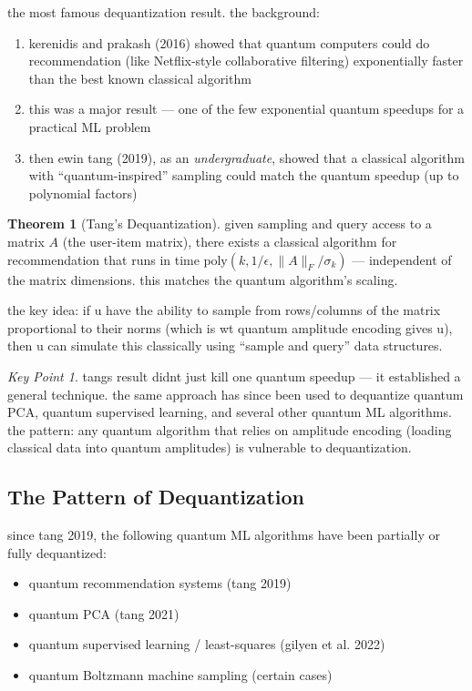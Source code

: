 \documentclass[11pt,a4paper]{article}
\theoremstyle{definition}
\newtheorem{theorem}{Theorem}[section]
\theoremstyle{remark}
\newtheorem*{keypoint}{Key Point}
\begin{document}
the most famous dequantization result. the background:

\begin{enumerate}[label=\arabic*.]
    \item kerenidis and prakash (2016) showed that quantum computers could do recommendation (like Netflix-style collaborative filtering) exponentially faster than the best known classical algorithm
    \item this was a major result --- one of the few exponential quantum speedups for a practical ML problem
    \item then ewin tang (2019), as an \emph{undergraduate}, showed that a classical algorithm with ``quantum-inspired'' sampling could match the quantum speedup (up to polynomial factors)
\end{enumerate}

\begin{theorem}[Tang's Dequantization]
given sampling and query access to a matrix $A$ (the user-item matrix), there exists a classical algorithm for recommendation that runs in time $\text{poly}(k, 1/\epsilon, \|A\|_F / \sigma_k)$ --- independent of the matrix dimensions. this matches the quantum algorithm's scaling.
\end{theorem}

the key idea: if u have the ability to sample from rows/columns of the matrix proportional to their norms (which is wt quantum amplitude encoding gives u), then u can simulate this classically using ``sample and query'' data structures.

\begin{keypoint}
tangs result didnt just kill one quantum speedup --- it established a general technique. the same approach has since been used to dequantize quantum PCA, quantum supervised learning, and several other quantum ML algorithms. the pattern: any quantum algorithm that relies on amplitude encoding (loading classical data into quantum amplitudes) is vulnerable to dequantization.
\end{keypoint}

\subsection{The Pattern of Dequantization}

since tang 2019, the following quantum ML algorithms have been partially or fully dequantized:
\begin{itemize}[nosep]
    \item quantum recommendation systems (tang 2019)
    \item quantum PCA (tang 2021)
    \item quantum supervised learning / least-squares (gilyen et al. 2022)
    \item quantum Boltzmann machine sampling (certain cases)
\end{itemize}
\end{document}
